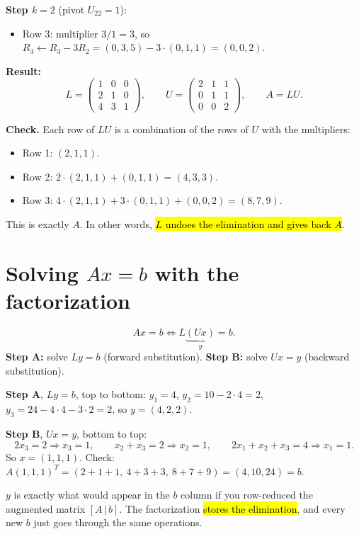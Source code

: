 \textbf{Step $k=2$} (pivot $U_{22}=1$):
\begin{itemize}
  \item Row 3: multiplier $3/1=3$, so $R_3\leftarrow R_3-3R_2 = (0,3,5)-3\cdot(0,1,1) = (0,0,2)$.
\end{itemize}

\textbf{Result:}
\[ L=\begin{pmatrix}1&0&0\\2&1&0\\4&3&1\end{pmatrix},\qquad U=\begin{pmatrix}2&1&1\\0&1&1\\0&0&2\end{pmatrix},\qquad A=LU. \]

\textbf{Check.} Each row of $LU$ is a combination of the rows of $U$ with the multipliers:
\begin{itemize}
  \item Row 1: $(2,1,1)$.
  \item Row 2: $2\cdot(2,1,1)+(0,1,1) = (4,3,3)$.
  \item Row 3: $4\cdot(2,1,1)+3\cdot(0,1,1)+(0,0,2) = (8,7,9)$.
\end{itemize}
This is exactly $A$. In other words, \hl{$L$ undoes the elimination and gives back $A$}.

\section{Solving $Ax=b$ with the factorization}

\[ Ax=b\iff L\underbrace{(Ux)}_{y}=b. \]
\textbf{Step A:} solve $Ly=b$ (forward substitution). \textbf{Step B:} solve $Ux=y$ (backward substitution).

\begin{example}[$b=(4,10,24)$]
\textbf{Step A}, $Ly=b$, top to bottom: $y_1=4$, $y_2=10-2\cdot4=2$, $y_3=24-4\cdot4-3\cdot2=2$, so $y=(4,2,2)$.

\textbf{Step B}, $Ux=y$, bottom to top:
\[ 2x_3=2\Rightarrow x_3=1,\qquad x_2+x_3=2\Rightarrow x_2=1,\qquad 2x_1+x_2+x_3=4\Rightarrow x_1=1. \]
So $x=(1,1,1)$. Check: $A(1,1,1)^T = (2+1+1,\ 4+3+3,\ 8+7+9) = (4,10,24)=b$. \checkmark
\end{example}

\begin{intuition}
$y$ is exactly what would appear in the $b$ column if you row-reduced the augmented matrix $[A\,|\,b]$.
The factorization \hl{stores the elimination}, and every new $b$ just goes through the same operations.
\end{intuition}

